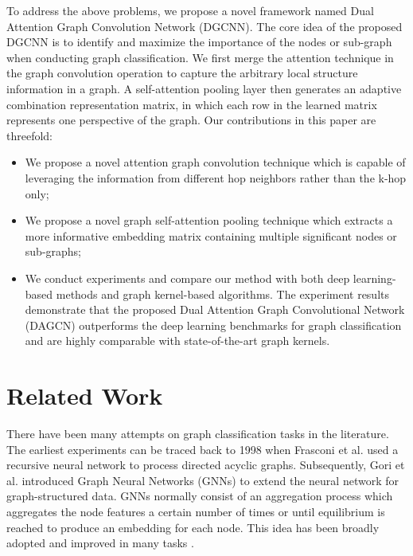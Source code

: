 \documentclass[conference]{IEEEtran}
\begin{document}
	     To address the above problems, we propose a novel framework named Dual Attention Graph Convolution Network (DGCNN). The core idea of the proposed DGCNN is to identify and maximize the importance of the nodes or sub-graph when conducting graph classification. We first merge the attention technique in the graph convolution operation to capture the arbitrary local structure information in a graph. A self-attention pooling layer then generates an adaptive combination representation matrix, in which each row in the learned matrix represents one perspective of the graph. Our contributions in this paper are threefold: 
	     \begin{itemize}
	         \item We propose a novel attention graph convolution technique which is capable of leveraging the information from different hop neighbors rather than the k-hop only; 
	         \item We propose a novel graph self-attention pooling technique which extracts a more informative embedding matrix containing multiple significant nodes or sub-graphs; 
	         \item We conduct experiments and compare our method with both deep learning-based methods and graph kernel-based algorithms. The experiment results demonstrate that the proposed Dual Attention Graph Convolutional Network (DAGCN) outperforms the deep learning benchmarks for graph classification and are highly comparable with state-of-the-art graph kernels.
	     \end{itemize}
	
	\section{Related Work}
	    There have been many attempts on graph classification tasks in the literature. The earliest experiments can be traced back to 1998 when Frasconi et al. \cite{frasconi1998general} used a recursive neural network to process directed acyclic graphs. Subsequently, Gori et al.\cite{gori2005new} introduced Graph Neural Networks (GNNs) to extend the neural network for graph-structured data. GNNs normally consist of an aggregation process which aggregates the node features a certain number of times or until equilibrium is reached to produce an embedding for each node. This idea has been broadly adopted and improved in many tasks \cite{henaff2015deep,li2015gated,pan2018adversarially}.
	    
\end{document}
